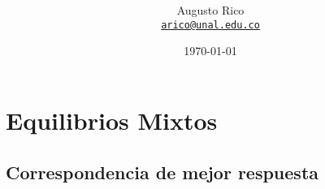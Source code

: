 \documentclass[11pt]{article}
\title{\text{Microeconomia III - $3^a$ Monitoria}
}
\author{Augusto Rico\\%
    \href{mailto:arico@unal.edu.co}{\texttt{arico@unal.edu.co}}
    }
\date{\today}
\begin{document}
\maketitle


\section{Equilibrios Mixtos}

\subsection{Correspondencia de mejor respuesta}
\end{document}
